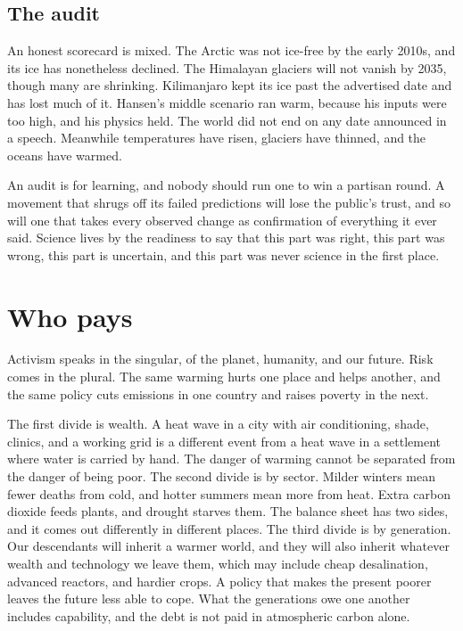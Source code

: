 \documentclass[12pt,a4paper]{book}
\begin{document}
\subsection{The audit}

An honest scorecard is mixed. The Arctic was not ice-free by the early 2010s, and its ice has nonetheless declined. The Himalayan glaciers will not vanish by 2035, though many are shrinking. Kilimanjaro kept its ice past the advertised date and has lost much of it. Hansen's middle scenario ran warm, because his inputs were too high, and his physics held. The world did not end on any date announced in a speech. Meanwhile temperatures have risen, glaciers have thinned, and the oceans have warmed.

An audit is for learning, and nobody should run one to win a partisan round. A movement that shrugs off its failed predictions will lose the public's trust, and so will one that takes every observed change as confirmation of everything it ever said. Science lives by the readiness to say that this part was right, this part was wrong, this part is uncertain, and this part was never science in the first place.

\section{Who pays}

Activism speaks in the singular, of the planet, humanity, and our future. Risk comes in the plural. The same warming hurts one place and helps another, and the same policy cuts emissions in one country and raises poverty in the next.

The first divide is wealth. A heat wave in a city with air conditioning, shade, clinics, and a working grid is a different event from a heat wave in a settlement where water is carried by hand. The danger of warming cannot be separated from the danger of being poor. The second divide is by sector. Milder winters mean fewer deaths from cold, and hotter summers mean more from heat. Extra carbon dioxide feeds plants, and drought starves them. The balance sheet has two sides, and it comes out differently in different places. The third divide is by generation. Our descendants will inherit a warmer world, and they will also inherit whatever wealth and technology we leave them, which may include cheap desalination, advanced reactors, and hardier crops. A policy that makes the present poorer leaves the future less able to cope. What the generations owe one another includes capability, and the debt is not paid in atmospheric carbon alone.
\end{document}
